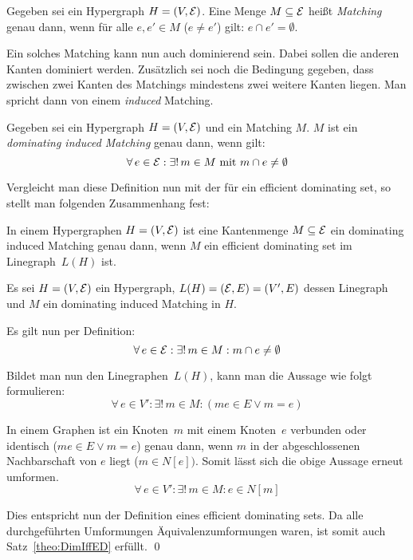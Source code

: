 \begin{mydef}\label{def:Matching}
    Gegeben sei ein Hypergraph $H=(V,\mathcal{E})$. Eine Menge $M \subseteq \mathcal{E}$ heißt \emph{Matching} genau dann, wenn für alle $e,e' \in M$ ($e \neq e'$) gilt: $e\cap e' = \emptyset$.
\end{mydef}

Ein solches Matching kann nun auch dominierend sein. Dabei sollen die anderen Kanten dominiert werden. Zusätzlich sei noch die Bedingung gegeben, dass zwischen zwei Kanten des Matchings mindestens zwei weitere Kanten liegen. Man spricht dann von einem \emph{induced} Matching.

\begin{mydef}
Gegeben sei ein Hypergraph $H=(V,\mathcal{E})$ und ein Matching $M$. $M$ ist ein \emph{dominating induced Matching} genau dann, wenn gilt:
\[ \forall\,e \in \mathcal{E} : \exists!\, m \in M \text{ mit } m\cap e \neq \emptyset \]
\end{mydef}

Vergleicht man diese Definition nun mit der für ein efficient dominating set, so stellt man folgenden Zusammenhang fest:

\begin{Theorem}\label{theo:DimIffED}
    In einem Hypergraphen $H=(V,\mathcal{E})$ ist eine Kantenmenge $M \subseteq \mathcal{E}$ ein dominating induced Matching genau dann, wenn $M$ ein efficient dominating set im Linegraph~$L(H)$ ist.
\end{Theorem}

\begin{Proof}
    Es sei $H=(V,\mathcal{E})$ ein Hypergraph, $L(H)=(\mathcal{E},E)=(V',E)$ dessen Linegraph und $M$ ein dominating induced Matching in $H$.

    Es gilt nun per Definition:
    \[ \forall\, e \in \mathcal{E}: \exists! \,m \in M: m\cap e \neq \emptyset \]
    
    Bildet man nun den Linegraphen~$L(H)$, kann man die Aussage wie folgt formulieren:
    \[ \forall\, e \in V': \exists!\,m \in M: (me \in E \lor m=e) \]
    
    In einem Graphen ist ein Knoten~$m$ mit einem Knoten~$e$ verbunden oder identisch ($me \in E \lor m=e$) genau dann, wenn $m$ in der abgeschlossenen Nachbarschaft von $e$ liegt ($m \in N[e])$. Somit lässt sich die obige Aussage erneut umformen.
    \[ \forall\, e \in V': \exists!\,m \in M: e \in N[m] \]
    
    Dies entspricht nun der Definition eines efficient dominating sets. Da alle durchgeführten Umformungen Äquivalenzumformungen waren, ist somit auch Satz~\ref{theo:DimIffED} erfüllt.
    \qed
\end{Proof}

